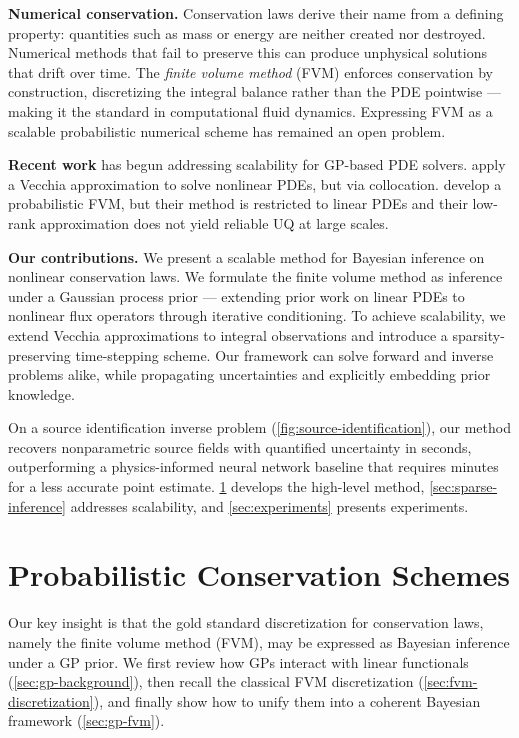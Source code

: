 \documentclass{article}
\theoremstyle{plain}
\theoremstyle{definition}
\theoremstyle{remark}
\begin{document}
\textbf{Numerical conservation.} Conservation laws derive their name from a defining property: quantities such as mass or energy are neither created nor destroyed.
Numerical methods that fail to preserve this can produce unphysical solutions that drift over time.
The \textit{finite volume method} (FVM) \citep{eymardFiniteVolumeMethods2000} enforces conservation by construction, discretizing the integral balance rather than the PDE pointwise --- making it the standard in computational fluid dynamics.
Expressing FVM as a scalable probabilistic numerical scheme has remained an open problem.

\textbf{Recent work} has begun addressing scalability for GP-based PDE solvers. \citet{chenSparseCholeskyFactorization2025} apply a Vecchia approximation to solve nonlinear PDEs, but via collocation.
\citet{weilandScalingProbabilisticPDE2024} develop a probabilistic FVM, but their method is restricted to linear PDEs and their low-rank approximation does not yield reliable UQ at large scales.

\textbf{Our contributions.}
We present a scalable method for Bayesian inference on nonlinear conservation laws.
We formulate the finite volume method as inference under a Gaussian process prior --- extending prior work on linear PDEs to nonlinear flux operators through iterative conditioning.
To achieve scalability, we extend Vecchia approximations to integral observations and introduce a sparsity-preserving time-stepping scheme.
Our framework can solve forward and inverse problems alike, while propagating uncertainties and explicitly embedding prior knowledge.

On a source identification inverse problem (\cref{fig:source-identification}), our method recovers nonparametric source fields with quantified uncertainty in seconds, outperforming a physics-informed neural network baseline that requires minutes for a less accurate point estimate.
\cref{sec:fvm-probabilistic} develops the high-level method, \cref{sec:sparse-inference} addresses scalability, and \cref{sec:experiments} presents experiments.

\section{Probabilistic Conservation Schemes}
\label{sec:fvm-probabilistic}

Our key insight is that the gold standard discretization for conservation laws, namely the finite volume method (FVM), may be expressed as Bayesian inference under a GP prior.
We first review how GPs interact with linear functionals (\cref{sec:gp-background}), then recall the classical FVM discretization (\cref{sec:fvm-discretization}), and finally show how to unify them into a coherent Bayesian framework (\cref{sec:gp-fvm}).
\end{document}
